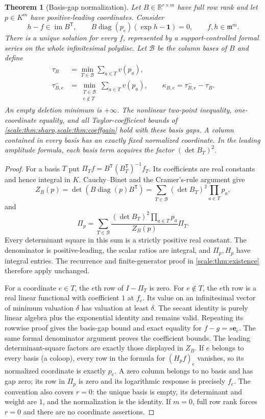 \documentclass[11pt,a4paper]{article}
\numberwithin{equation}{section}
\newtheorem{theorem}{Theorem}[section]
\theoremstyle{definition}
\newcommand{\R}{\mathbb R}
\newcommand{\mm}{\mathfrak m}
\newcommand{\im}{\operatorname{im}}
\newcommand{\diag}{\operatorname{diag}}
\begin{document}
\begin{theorem}[Basis-gap normalization]\label{scale:thm:linear}
Let $B\in\R^{r\times m}$ have full row rank and let
$p\in K^m$ have positive-leading coordinates. Consider
\[
 h-f\in\im B^{\mathsf T},\qquad
 B\diag(p_e)(\exp h-\mathbf1)=0,
 \qquad f,h\in\mm^m.
\]
There is a unique solution for every $f$, represented by a
support-controlled formal series on the whole infinitesimal
polydisc. Let $\mathcal B$ be the column bases of $B$ and define
\begin{align*}
 \tau_B&=\min_{T\in\mathcal B}\sum_{a\in T}v(p_a),\\
 \tau_{B,e}^-&=\min_{\substack{T\in\mathcal B\\e\notin T}}
                              \sum_{a\in T}v(p_a),
 \qquad \kappa_{B,e}=\tau_{B,e}^--\tau_B.
\end{align*}
An empty deletion minimum is $+\infty$. The nonlinear two-point
inequality, one-coordinate equality, and all Taylor-coefficient bounds of \cref{scale:thm:sharp,scale:thm:coeffgain}
hold with these basis gaps. A column contained in every basis has
an exactly fixed normalized coordinate. In the leading amplitude
formula, each basis term acquires the factor $(\det B_T)^2$.
\end{theorem}
\begin{proof}
For a basis $T$ put
$\Pi_Tf=B^{\mathsf T}(B_T^{\mathsf T})^{-1}f_T$.
Its coefficients are real constants and hence integral in $K$.
Cauchy--Binet and the Cramer's-rule argument give
\[
 Z_B(p)=\det(B\diag(p)B^{\mathsf T})
       =\sum_{T\in\mathcal B}(\det B_T)^2\prod_{a\in T}p_a,
\]
and
\[
 \Pi_p=\sum_{T\in\mathcal B}
 \frac{(\det B_T)^2\prod_{a\in T}p_a}{Z_B(p)}\Pi_T.
\]
Every determinant square in this sum is a strictly positive real
constant. The denominator is positive-leading, the scalar ratios
are integral, and $\Pi_p,H_p$ have integral entries. The recurrence
and finite-generator proof in \cref{scale:thm:existence} therefore
apply unchanged.

For a coordinate $e\in T$, the $e$th row of $I-\Pi_T$ is zero.
For $e\notin T$, the $e$th row is a real linear functional with
coefficient $1$ at $f_e$. Its value on an infinitesimal vector of
minimum valuation $\delta$ has valuation at least $\delta$.
The secant identity is purely linear algebra plus the exponential
identity and remains valid. Repeating its rowwise proof gives the
basis-gap bound and exact equality for $f-g=s\mathbf e_e$.
The same formal denominator argument proves the coefficient bounds.
The leading determinant-square factors are exactly those displayed
in $Z_B$. If $e$ belongs to every basis (a coloop), every row in the
formula for $(H_pf)_e$ vanishes, so its normalized coordinate is exactly
$p_e$. A zero column belongs to no basis and has gap zero; its row in $\Pi_p$
is zero and its logarithmic response is precisely $f_e$.
The convention also covers $r=0$: the unique basis is empty, its determinant
and weight are $1$, and the normalization is the identity. If $m=0$,
full row rank forces $r=0$ and there are no coordinate assertions.
\end{proof}
\end{document}
